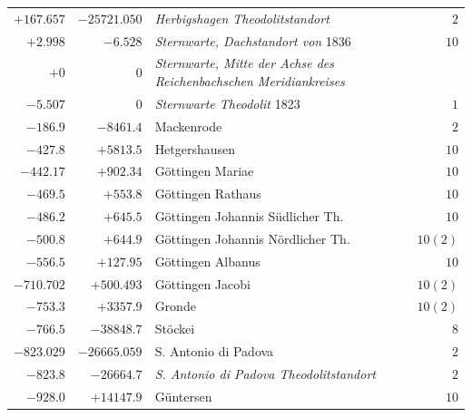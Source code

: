 \begin{center}
\begin{tabular}{r|r|p{170pt}|r}
\(+167.657\)&\(-25721.050\)&\textit{Herbigshagen Theodolitstandort}&\(2\)\\
\(+2.998\)&\(-6.528\)&\textit{Sternwarte, Dachstandort von} 1836&\(10\)\\
\(+0\)&\(0\)&\textit{Sternwarte, Mitte der Achse des Reichenbachschen Meridiankreises}&\\
\(-5.507\)&\(0\)&\textit{Sternwarte Theodolit} 1823&\(1\)\\
\(-186.9\)&\(-8461.4\)&Mackenrode&\(2\)\\
\(-427.8\)&\(+5813.5\)&Hetgershausen&\(10\)\\
\(-442.17\)&\(+902.34\)&Göttingen Mariae&\(10\)\\
\(-469.5\)&\(+553.8\)&Göttingen Rathaus&\(10\)\\
\(-486.2\)&\(+645.5\)&Göttingen Johannis Südlicher Th.&\(10\)\\
\(-500.8\)&\(+644.9\)&Göttingen Johannis Nördlicher Th.&\(10(2)\)\\
\(-556.5\)&\(+127.95\)&Göttingen Albanus&\(10\)\\
\(-710.702\)&\(+500.493\)&Göttingen Jacobi&\(10(2)\)\\
\(-753.3\)&\(+3357.9\)&Gronde&\(10(2)\)\\
\(-766.5\)&\(-38848.7\)&Stöckei&\(8\)\\
\(-823.029\)&\(-26665.059\)&S. Antonio di Padova&\(2\)\\
\(-823.8\)&\(-26664.7\)&\textit{S. Antonio di Padova Theodolitstandort}&\(2\)\\
\(-928.0\)&\(+14147.9\)&Güntersen&\(10\)\\
\hline\end{tabular}\endgroup\end{center}

